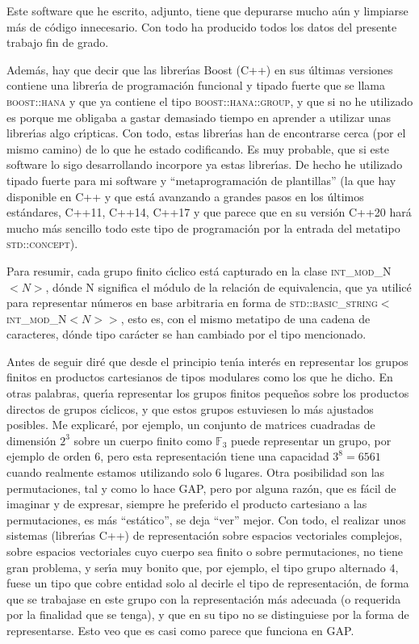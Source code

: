 \documentclass[final,12pt,a4paper,twoside,fleqn]{extbook}
\theoremstyle{definition}
\theoremstyle{remark}
\begin{document}
Este software que he escrito, adjunto, tiene que depurarse mucho a\'un y limpiarse m\'as de c\'odigo innecesario.
Con todo ha producido todos los datos del presente trabajo fin de grado.

Adem\'as, hay que decir que las librer{\'{\i}}as Boost (C++) en sus \'ultimas versiones contiene una librer{\'{\i}}a de programaci\'on
funcional y tipado fuerte que se llama \textsc{boost::hana} y que ya contiene el tipo \textsc{boost::hana::group},
y que si no he utilizado es porque  me obligaba a gastar demasiado tiempo en aprender a utilizar unas librer{\'{\i}}as
algo cr{\'{\i}}pticas. Con todo, estas
librer{\'{\i}}as han de encontrarse cerca (por el mismo camino) de lo que he estado codificando. Es muy probable,
que si este software lo sigo desarrollando incorpore ya estas librer{\'{\i}}as. De hecho he utilizado tipado fuerte para
mi software y ``metaprogramaci\'on de plantillas'' (la que hay disponible en C++ y que est\'a avanzando a grandes pasos
en los \'ultimos est\'andares, C++11, C++14, C++17 y que parece que en su versi\'on C++20 har\'a mucho m\'as sencillo
todo este tipo de programaci\'on por la entrada del metatipo \textsc{std::concept}).

Para resumir, cada grupo finito c{\'{\i}}clico est\'a capturado en la clase \textsc{int\_mod\_N}$<N>$, d\'onde
\textsc{N} significa el m\'odulo
de la relaci\'on de equivalencia, que ya utilic\'e para representar n\'umeros en base arbitraria en forma de
\textsc{std::basic\_string}$<$\textsc{int\_mod\_N}$<N>>$, esto es,
con el mismo metatipo de una cadena de caracteres,
d\'onde tipo car\'acter se han cambiado por el tipo mencionado.

Antes de seguir dir\'e que desde el principio ten{\'{\i}}a inter\'es en representar los grupos finitos en productos cartesianos
de tipos modulares como los que he dicho. En otras palabras, quer{\'{\i}}a representar los grupos finitos pequeños sobre
los productos directos de grupos c{\'{\i}}clicos, y que estos grupos estuviesen lo m\'as ajustados posibles. Me explicar\'e,
por ejemplo, un conjunto de matrices cuadradas de dimensi\'on $2^3$ sobre un cuerpo finito como $\mathds{F}_{3}$
puede representar un grupo, por ejemplo de orden $6$, pero esta representaci\'on tiene una capacidad $3^8=6561$
cuando realmente estamos utilizando solo $6$ lugares. Otra posibilidad son las permutaciones, tal y como lo hace GAP,
pero por alguna raz\'on, que es f\'acil de imaginar y de expresar,
siempre he preferido el producto cartesiano a las permutaciones, es
m\'as ``est\'atico'', se deja ``ver'' mejor. Con todo, el realizar unos sistemas (librer{\'{\i}}as C++) de representaci\'on
sobre espacios vectoriales complejos, sobre espacios vectoriales cuyo cuerpo sea finito o sobre permutaciones,
no tiene gran problema, y ser{\'{\i}}a muy bonito que, por ejemplo, el tipo grupo alternado $4$, fuese un tipo que cobre
entidad solo al decirle el tipo de representaci\'on, de forma que se trabajase en este grupo con la representaci\'on m\'as
adecuada (o requerida por la finalidad que se tenga), y que en su tipo no se distinguiese
por la forma de representarse. Esto veo que es casi como parece que
funciona en GAP.
\end{document}
